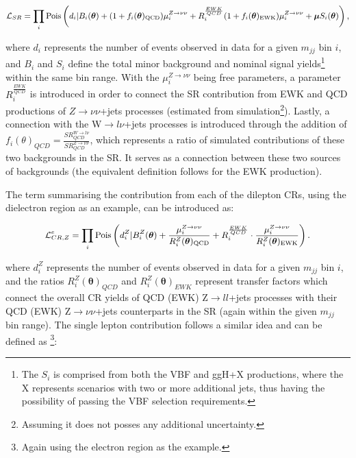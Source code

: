 \begin{equation}
 \small{\mathcal{L}_{SR} =  \prod_{i} \mathrm{Pois}\left(d_{i} | B_{i}(\boldsymbol{\theta}) + (1+f_{i}(\boldsymbol{\theta})_{\mathrm{QCD}}) \mu_{i}^{Z\rightarrow \nu\nu} + R^{\frac{EWK}{QCD}}_{i} (1+f_{i}(\boldsymbol{\theta})_{\mathrm{EWK}}) \mu_{i}^{Z\rightarrow \nu\nu}+ \boldsymbol{\mu} S_{i}(\boldsymbol{\theta})\right ),}
 \label{eq:likelihood_sr}
\end{equation}

where $d_i$ represents the number of events observed in data for a given $m_{jj}$ bin $i$, and $B_i$ and $S_i$ define the total minor background and nominal signal yields\footnote{The $S_i$ is comprised from both the VBF and ggH+X productions, where the X represents scenarios with two or more additional jets, thus having the possibility of passing the VBF selection requirements.} within the same bin range. With the $\mu_i^{Z\rightarrow \nu\nu}$ being free parameters, a parameter $R^{\frac{EWK}{QCD}}_{i}$ is introduced in order to connect the SR contribution from EWK and QCD productions of $Z\rightarrow \nu\nu$+jets processes (estimated from simulation\footnote{Assuming it does not posses any additional uncertainty.}). Lastly, a connection with the W$\rightarrow l\nu$+jets processes is introduced through the addition of $f_i(\theta)_{QCD} = \frac{SR^{W\rightarrow l\nu}_{QCD}}{SR^{Z\rightarrow \nu\nu}_{QCD}}$, which represents a ratio of simulated contributions of these two backgrounds in the SR. It serves as a connection between these two sources of backgrounds (the equivalent definition follows for the EWK production).

\hspace{10pt} The term summarising the contribution from each of the dilepton CRs, using the dielectron region as an example, can be introduced as:

\begin{equation}
\small
  \small{\mathcal{L}_{CR,Z}^{e} = \prod_{i} \mathrm{Pois} \left(d^{Z}_{i}|B^{Z}_{i}(\boldsymbol{\theta}) +\frac{\mu_i^{Z\rightarrow \nu\nu}}{R^{Z}_{i} (\boldsymbol{\theta})_{\mathrm{QCD}}} + R^{\frac{EWK}{QCD}}_{i}\cdot\frac{\mu_i^{Z\rightarrow \nu\nu} }{R^{Z}_{i} (\boldsymbol{\theta})_{\mathrm{EWK}}} \right).}
    \label{eq:likelihood_dilepton}
\end{equation}

where $d_i^Z$ represents the number of events observed in data for a given $m_{jj}$ bin $i$, and the ratios $R_i^Z(\boldsymbol{\theta})_{QCD}$ and $R_i^Z(\boldsymbol{\theta})_{EWK}$ represent transfer factors which connect the overall CR yields of QCD (EWK) Z$\rightarrow ll$+jets processes with their QCD (EWK) Z$\rightarrow \nu\nu$+jets counterparts in the SR (again within the given $m_{jj}$ bin range). The single lepton contribution follows a similar idea and can be defined as \footnote{Again using the electron region as the example.}:

